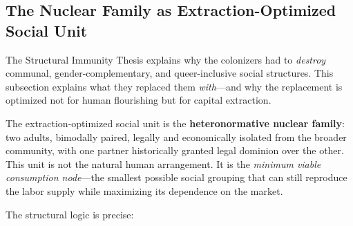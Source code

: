 \documentclass[12pt,openany]{book}
\begin{document}
\subsection{The Nuclear Family as Extraction-Optimized Social Unit}

The Structural Immunity Thesis explains why the colonizers had to \textit{destroy} communal, gender-complementary, and queer-inclusive social structures. This subsection explains what they replaced them \textit{with}---and why the replacement is optimized not for human flourishing but for capital extraction.

The extraction-optimized social unit is the \textbf{heteronormative nuclear family}: two adults, bimodally paired, legally and economically isolated from the broader community, with one partner historically granted legal dominion over the other. This unit is not the natural human arrangement. It is the \textit{minimum viable consumption node}---the smallest possible social grouping that can still reproduce the labor supply while maximizing its dependence on the market.

The structural logic is precise:
\end{document}
